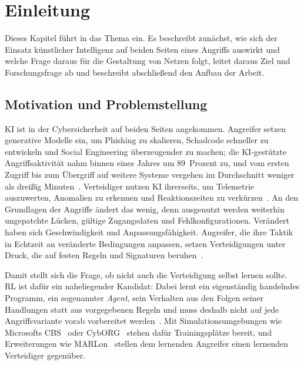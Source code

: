 \chapter{Einleitung}
\label{ch:einleitung}

Dieses Kapitel führt in das Thema ein. Es beschreibt zunächst, wie sich
der Einsatz künstlicher Intelligenz auf beiden Seiten eines Angriffs
auswirkt und welche Frage daraus für die Gestaltung von Netzen folgt,
leitet daraus Ziel und Forschungsfrage ab und beschreibt abschließend den
Aufbau der Arbeit.

\section{Motivation und Problemstellung}
\label{sec:motivation}

\ac{KI} ist in der Cybersicherheit auf beiden Seiten
angekommen. Angreifer setzen generative Modelle ein, um Phishing zu
skalieren, Schadcode schneller zu entwickeln und Social Engineering
überzeugender zu machen; die KI-gestützte Angriffsaktivität nahm binnen
eines Jahres um 89~Prozent zu, und vom ersten Zugriff bis zum Übergriff
auf weitere Systeme vergehen im Durchschnitt weniger als dreißig
Minuten~\cite{crowdstrike2026gtr}. Verteidiger nutzen \ac{KI} ihrerseits,
um Telemetrie auszuwerten, Anomalien zu erkennen und Reaktionszeiten zu
verkürzen~\cite{xforce2026}. An den Grundlagen der Angriffe ändert das wenig, denn ausgenutzt werden
weiterhin ungepatchte Lücken, gültige Zugangsdaten und
Fehlkonfigurationen. Verändert haben sich Geschwindigkeit und
Anpassungsfähigkeit. Angreifer, die ihre Taktik in Echtzeit an veränderte
Bedingungen anpassen, setzen Verteidigungen unter Druck, die auf festen
Regeln und Signaturen beruhen~\cite{xforce2026}.

Damit stellt sich die Frage, ob nicht auch die Verteidigung selbst lernen
sollte. \ac{RL} ist dafür ein naheliegender Kandidat: Dabei lernt ein
eigenständig handelndes Programm, ein sogenannter \emph{Agent}, sein
Verhalten aus den Folgen seiner Handlungen statt aus vorgegebenen Regeln und
muss deshalb nicht auf jede Angriffsvariante vorab vorbereitet
werden~\cite{nguyen2023drl}. Mit Simulationsumgebungen wie
Microsofts \ac{CBS}~\cite{cyberbattlesim2021} oder
CybORG~\cite{standen2021cyborg} stehen dafür Trainingsplätze bereit, und
Erweiterungen wie MARLon~\cite{marlon} stellen dem lernenden Angreifer
einen lernenden Verteidiger gegenüber.

